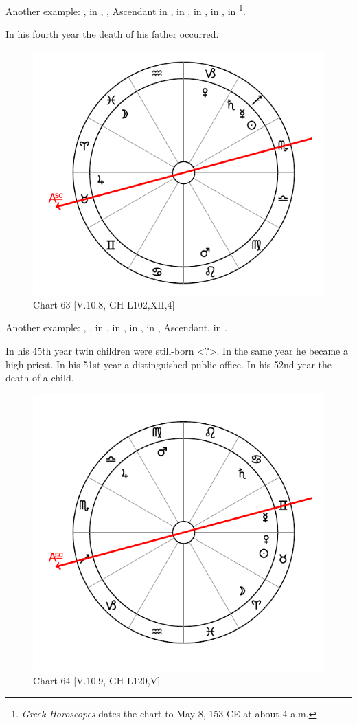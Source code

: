 \noindent Another example: \Sun, \Mars\xspace in \Taurus, \Moon, Ascendant in \Aries, \Saturn\xspace in \Leo, \Jupiter\xspace in \Cancer, \Venus\xspace in \Pisces, \Mercury\xspace in \Gemini\footnote{\textit{Greek Horoscopes} dates the chart to May 8, 153 CE at about 4 a.m.}. 

In his fourth year the death of his father occurred.

\vspace{1.2cm}

\begin{figure}
\centering
\vspace{-20pt}
\includegraphics[width=.68\textwidth]{charts/5_10_08}
\caption{Chart 63 [V.10.8, GH L102,XII,4]}
\label{fig:chart63}
\end{figure}

\noindent Another example: \Sun, \Mercury, \Saturn\xspace in \Sagittarius, \Moon in \Pisces, \Mars\xspace in \Leo, \Venus\xspace in \Capricorn, Ascendant, \Jupiter\xspace in \Taurus. 

In his 45th year twin children were still-born <?>. In the same
year he became a high-priest. In his 51st year a distinguished public office. In his 52nd year the death of a child. 

\begin{figure}
\centering
\vspace{-20pt}
\includegraphics[width=.68\textwidth]{charts/5_10_09}
\caption{Chart 64 [V.10.9, GH L120,V]}
\label{fig:chart64}
\end{figure}


